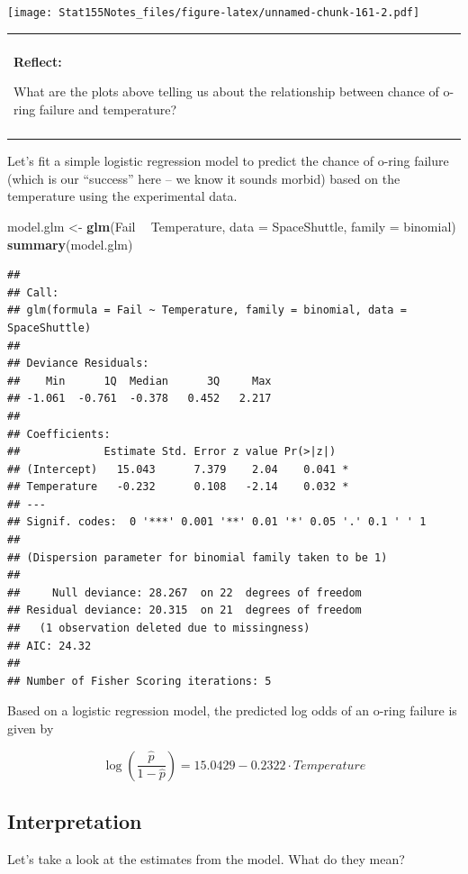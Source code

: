 \documentclass[]{book}
\newenvironment{Shaded}{\begin{snugshade}}{\end{snugshade}}
\newcommand{\DataTypeTok}[1]{\textcolor[rgb]{0.13,0.29,0.53}{#1}}
\newcommand{\KeywordTok}[1]{\textcolor[rgb]{0.13,0.29,0.53}{\textbf{#1}}}
\newcommand{\NormalTok}[1]{#1}
\newcommand{\OperatorTok}[1]{\textcolor[rgb]{0.81,0.36,0.00}{\textbf{#1}}}
\newcommand{\StringTok}[1]{\textcolor[rgb]{0.31,0.60,0.02}{#1}}
\newenvironment{reflect}
{
    \begin{center}
    
    \begin{tabular}{|p{0.8\textwidth}|}
    \rowcolor{LightBlue}
    \hline\\
    \rowcolor{LightBlue}
    \textbf{Reflect:}
}
{
    \\\rowcolor{LightBlue}
    \\\hline
    \end{tabular} 
    \end{center}
}
\begin{document}
\texttt{[image: Stat155Notes\_files/figure-latex/unnamed-chunk-161-2.pdf]}

\begin{reflect}
What are the plots above telling us about the relationship between
chance of o-ring failure and temperature?
\end{reflect}

Let's fit a simple logistic regression model to predict the chance of o-ring failure (which is our ``success'' here -- we know it sounds morbid) based on the temperature using the experimental data.

\begin{Shaded}
\begin{Highlighting}[]
\NormalTok{model.glm <-}\StringTok{ }\KeywordTok{glm}\NormalTok{(Fail }\OperatorTok{~}\StringTok{ }\NormalTok{Temperature, }\DataTypeTok{data =}\NormalTok{ SpaceShuttle, }\DataTypeTok{family =}\NormalTok{ binomial)}
\KeywordTok{summary}\NormalTok{(model.glm)}
\end{Highlighting}
\end{Shaded}

\begin{verbatim}
## 
## Call:
## glm(formula = Fail ~ Temperature, family = binomial, data = SpaceShuttle)
## 
## Deviance Residuals: 
##    Min      1Q  Median      3Q     Max  
## -1.061  -0.761  -0.378   0.452   2.217  
## 
## Coefficients:
##             Estimate Std. Error z value Pr(>|z|)  
## (Intercept)   15.043      7.379    2.04    0.041 *
## Temperature   -0.232      0.108   -2.14    0.032 *
## ---
## Signif. codes:  0 '***' 0.001 '**' 0.01 '*' 0.05 '.' 0.1 ' ' 1
## 
## (Dispersion parameter for binomial family taken to be 1)
## 
##     Null deviance: 28.267  on 22  degrees of freedom
## Residual deviance: 20.315  on 21  degrees of freedom
##   (1 observation deleted due to missingness)
## AIC: 24.32
## 
## Number of Fisher Scoring iterations: 5
\end{verbatim}

Based on a logistic regression model, the predicted log odds of an o-ring failure is given by

\[\log\left(\frac{\hat{p}}{1-\hat{p}}\right) = 15.0429 -0.2322\cdot Temperature\]

\hypertarget{interpretation-1}{%
\subsection{Interpretation}\label{interpretation-1}}

Let's take a look at the estimates from the model. What do they mean?
\end{document}
